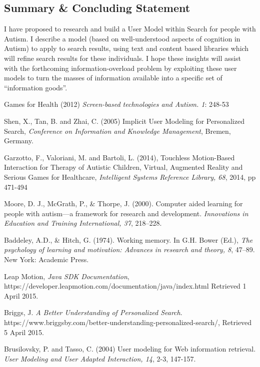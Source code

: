 \documentclass[a4paper, 11pt]{article}
\begin{document}
\subsection{Summary \& Concluding Statement}\label{future}
I have proposed to research and build a User Model within Search for people with Autism. I describe a model (based on well-understood aspects of cognition in Autism) to apply to search results, using text and content based libraries which will refine search results for these individuals. I hope these insights will assist with the forthcoming information-overload problem by exploiting these user models to turn the masses of information available into a specific set of “information goods”. 

\clearpage
\begin{thebibliography}{100}

 Games for Health (2012) \textit{Screen-based technologies and Autism. 1}: 248-53

Shen, X., Tan, B. and Zhai, C. (2005) Implicit User Modeling for Personalized Search, \textit{Conference on Information and Knowledge Management}, Bremen, Germany.

 Garzotto, F., Valoriani, M. and Bartoli, L. (2014), Touchless Motion-Based Interaction for Therapy of Autistic Children, Virtual, Augmented Reality and Serious Games for Healthcare, \textit{Intelligent Systems Reference Library, 68}, 2014, pp 471-494

Moore, D. J., McGrath, P., \& Thorpe, J. (2000). Computer aided learning for people with autism—a framework for research and development. \textit{Innovations in Education and Training International, 37}, 218–228.

Baddeley, A.D., \& Hitch, G. (1974). Working memory. In G.H. Bower (Ed.), \textit{The psychology of learning and motivation: Advances in research and theory, 8}, 47–89. New York: Academic Press.

 Leap Motion, \textit{Java SDK Documentation}, \\https://developer.leapmotion.com/documentation/java/index.html Retrieved 1 April 2015.

Briggs, J. \textit{A Better Understanding of Personalized Search}. https://www.briggsby.com/better-understanding-personalized-search/, Retrieved 5 April 2015.

 Brusilovsky, P. and Tasso, C. (2004) User modeling for Web information retrieval. \textit{User Modeling and User Adapted Interaction, 14}, 2-3, 147-157.



\end{thebibliography}
\end{document}
